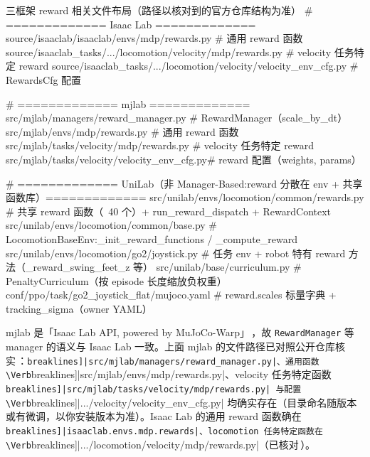 \begin{codebox}[text]{三框架 reward 相关文件布局（路径以核对到的官方仓库结构为准）}
# ============= Isaac Lab =============
source/isaaclab/isaaclab/envs/mdp/rewards.py                 # 通用 reward 函数
source/isaaclab_tasks/.../locomotion/velocity/mdp/rewards.py # velocity 任务特定 reward
source/isaaclab_tasks/.../locomotion/velocity/velocity_env_cfg.py # RewardsCfg 配置

# ============= mjlab =============
src/mjlab/managers/reward_manager.py        # RewardManager（scale_by_dt）
src/mjlab/envs/mdp/rewards.py               # 通用 reward 函数
src/mjlab/tasks/velocity/mdp/rewards.py     # velocity 任务特定 reward
src/mjlab/tasks/velocity/velocity_env_cfg.py# reward 配置（weights, params）

# ============= UniLab（非 Manager-Based:reward 分散在 env + 共享函数库）=============
src/unilab/envs/locomotion/common/rewards.py      # 共享 reward 函数（~40 个）+ run_reward_dispatch + RewardContext
src/unilab/envs/locomotion/common/base.py         # LocomotionBaseEnv:_init_reward_functions / _compute_reward
src/unilab/envs/locomotion/go2/joystick.py        # 任务 env + robot 特有 reward 方法（_reward_swing_feet_z 等）
src/unilab/base/curriculum.py                      # PenaltyCurriculum（按 episode 长度缩放负权重）
conf/ppo/task/go2_joystick_flat/mujoco.yaml       # reward.scales 标量字典 + tracking_sigma（owner YAML）
\end{codebox}

\begin{note}
mjlab 是「Isaac Lab API, powered by MuJoCo-Warp」\,\cite{mjlab2026}，故 \verb|RewardManager| 等 manager 的语义与 Isaac Lab 一致。上面 mjlab 的文件路径已对照公开仓库核实\,\cite{mjlab2026}：\Verb[breaklines]|src/mjlab/managers/reward_manager.py|、通用函数 \Verb[breaklines]|src/mjlab/envs/mdp/rewards.py|、velocity 任务特定函数 \Verb[breaklines]|src/mjlab/tasks/velocity/mdp/rewards.py| 与配置 \Verb[breaklines]|.../velocity/velocity_env_cfg.py| 均确实存在（目录命名随版本或有微调，以你安装版本为准）。Isaac Lab 的通用 reward 函数确在 \Verb[breaklines]|isaaclab.envs.mdp.rewards|、locomotion 任务特定函数在 \Verb[breaklines]|.../locomotion/velocity/mdp/rewards.py|（已核对\,\cite{isaaclab2024}）。
\end{note}

